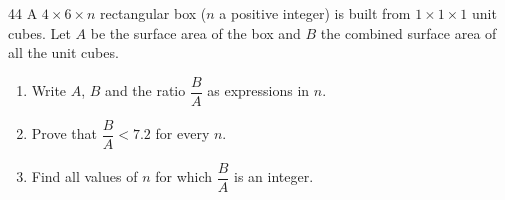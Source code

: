 \begin{probbox}{44}{}
A $4\times 6\times n$ rectangular box ($n$ a positive integer) is built from $1\times1\times1$ unit cubes. Let $A$ be the surface area of the box and $B$ the combined surface area of all the unit cubes.
\begin{enumerate}[label=\alph*),leftmargin=1.6em,itemsep=1pt]
\item Write $A$, $B$ and the ratio $\dfrac{B}{A}$ as expressions in $n$.
\item Prove that $\dfrac{B}{A}<7.2$ for every $n$.
\item Find all values of $n$ for which $\dfrac{B}{A}$ is an integer.
\end{enumerate}
\end{probbox}

